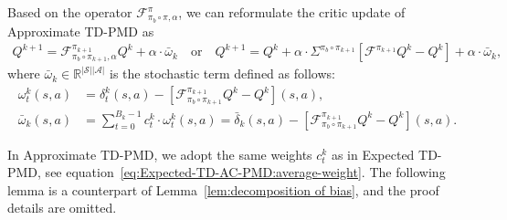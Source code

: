 \documentclass[10pt]{article}
\newcommand{\calA}{\mathcal{A}}
\newcommand{\calS}{\mathcal{S}}
\newcommand{\calF}{\mathcal{F}}
\newcommand{\ls}{\left}
\newcommand{\rs}{\right}
\theoremstyle{plain}
\theoremstyle{definition}
\begin{document}
Based on the operator $\calF^{\pi}_{\pi_b\circ\pi, \alpha}$, we can reformulate the critic update of Approximate TD-PMD as
\begin{equation}
\begin{aligned}
    Q^{k+1} = \calF^{\pi_{k+1}}_{\pi_b\circ\pi_{k+1}, \alpha} Q^k + \alpha \cdot \bar\omega_k \quad \mbox{or} \quad Q^{k+1} = Q^k + \alpha \cdot \Sigma^{\pi_b\circ\pi_{k+1}} \ls[ \calF^{\pi_{k+1}} Q^k - Q^k \rs] + \alpha \cdot \bar\omega_k,
\end{aligned}
    \label{eq:Approximated-TD-AC-PMD:critic-update}
\end{equation}
where $\bar{\omega}_k \in \mathbb{R}^{|\calS||\calA|}$ is the stochastic term defined as follows:
\begin{equation}
\begin{aligned}
    \omega_t^k(s,a) &= \delta_t^k(s,a) - \ls[ \calF^{\pi_{k+1}}_{\pi_b \circ \pi_{k+1}} Q^k - Q^k \rs](s,a), \\
    \bar\omega_k(s,a) &= \sum_{t=0}^{B_k-1} c_t^k \cdot \omega_t^k(s,a) = \bar\delta_k(s,a) - \ls[ \calF^{\pi_{k+1}}_{\pi_b \circ \pi_{k+1}} Q^k - Q^k \rs](s,a).
\end{aligned}
\label{eq:Approximated-TD-AC-PMD:stochastic-noise}
\end{equation}

In Approximate TD-PMD, we adopt the same  weights $c_t^k$ as in Expected TD-PMD, see equation~\eqref{eq:Expected-TD-AC-PMD:average-weight}. The following lemma is a counterpart of Lemma~\ref{lem:decomposition of bias}, and the proof details are omitted.
\end{document}
